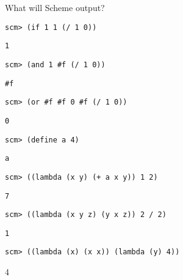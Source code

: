 \begin{blocksection}
\question What will Scheme output?

\begin{lstlisting}
scm> (if 1 1 (/ 1 0))
\end{lstlisting}
\begin{solution}[0.25in]
\begin{lstlisting}
1
\end{lstlisting}
\end{solution}

\begin{lstlisting}
scm> (and 1 #f (/ 1 0))
\end{lstlisting}
\begin{solution}[0.25in]
\begin{lstlisting}
#f
\end{lstlisting}
\end{solution}

\begin{lstlisting}
scm> (or #f #f 0 #f (/ 1 0))
\end{lstlisting}
\begin{solution}[0.25in]
\begin{lstlisting}
0
\end{lstlisting}
\end{solution}

\begin{lstlisting}
scm> (define a 4)
\end{lstlisting}
\begin{solution}[0.25in]
\begin{lstlisting}
a
\end{lstlisting}
\end{solution}

\begin{lstlisting}
scm> ((lambda (x y) (+ a x y)) 1 2)
\end{lstlisting}
\begin{solution}[0.25in]
\begin{lstlisting}
7
\end{lstlisting}
\end{solution}

\begin{lstlisting}
scm> ((lambda (x y z) (y x z)) 2 / 2)
\end{lstlisting}
\begin{solution}[0.25in]
\begin{lstlisting}
1
\end{lstlisting}
\end{solution}

\begin{lstlisting}
scm> ((lambda (x) (x x)) (lambda (y) 4))
\end{lstlisting}
\begin{solution}[0.25in]
4
\end{solution}
\end{blocksection}

